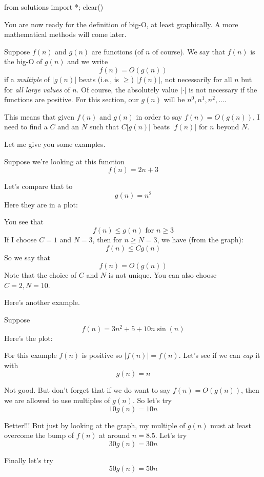 \begin{python0}
from solutions import *; clear()
\end{python0}

You are now ready for the definition of big-O, at least graphically.
A more mathematical methods will come later.

Suppose $f(n)$ and $g(n)$ are functions (of $n$ of course).
We say that $f(n)$ is the big-O of $g(n)$ and we
write 
\[
f(n) = O(g(n))
\]
if a \textit{multiple} of $|g(n)|$ beats (i.e., is $\geq$) $|f(n)|$,
not necessarily for all $n$
but for \textit{all large values} of $n$.
Of course,
the absolutely value $| \cdot |$ is not necessary if the functions are
positive. 
For this section, our $g(n)$ will be $n^0, n^1, n^2, ...$.

This means that given $f(n)$ and $g(n)$ 
in order to say $f(n) = O(g(n))$, I need to find a $C$ and an $N$ such that
$C|g(n)|$ beats $|f(n)|$ for $n$ beyond $N$.

Let me give you some examples.

Suppose we're looking at this function
\[
f(n) = 2n + 3
\]

Let's compare that to
\[
g(n) = n^2
\]
Here they are in a plot:

You see that 
\[
f(n) \leq g(n) \text{ for $n \geq 3$}
\]
If I choose $C = 1$ and $N = 3$, then for $n \geq N = 3$, 
we have (from the graph):
\[
f(n) \leq Cg(n)
\]
So we say that 
\[
f(n) = O(g(n))
\]
Note that the choice of $C$ and $N$ is not unique.
You can also choose $C = 2, N = 10$.

Here's another example.

Suppose
\[
f(n) = 3n^2 + 5 + 10 n \sin (n)
\]
Here's the plot:

For this example $f(n)$ is positive so $|f(n)| = f(n)$.
Let's see if we can \textit{cap} it with 
\[
g(n) = n
\]

Not good.
But don't forget that if we do want to say $f(n) = O(g(n))$,
then we are allowed to use multiples of $g(n)$.
So let's try
\[
10g(n) = 10 n
\]


Better!!!
But just by looking at the graph,
my multiple of $g(n)$ must at least 
overcome the bump of $f(n)$ at around $n=8.5$.
Let's try 
\[
30g(n) = 30 n
\]


Finally let's try
\[
50g(n) = 50n
\]


